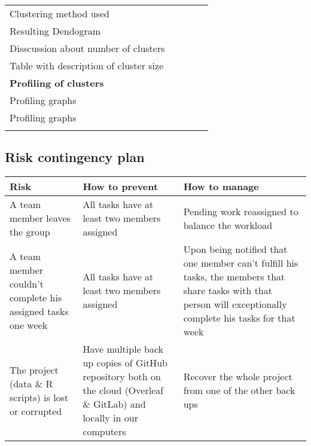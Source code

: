 \begin{table}[H]
\begin{tabular}{@{}lcccc@{}}
Clustering method used                          &    &    &    &    \\
Resulting Dendogram                             &    &    &    &    \\
Disscussion about number of clusters            &    &    &    &    \\
Table with description of cluster size          &    &    &    &    \\ \midrule
\textbf{Profiling of clusters}                  &    &    &    &    \\
Profiling graphs                                &    &    &    &    \\
Profiling graphs                                &    &    &    &    \\
\\ \bottomrule
\end{tabular}
\end{table}

\subsection{Risk contingency plan}%
\label{sub:risk_contingency_plan}


\begin{table}[H]
\centering
\begin{tabular}{@{}p{5cm}p{5cm}p{5cm}@{}}
\toprule
Risk & How to prevent & How to manage \\ \midrule
A team member leaves the group & All tasks have at least two members assigned & Pending work reassigned to balance the workload\\
\addlinespace[0.5em]
A team member couldn't complete his assigned tasks one week & All tasks have at least two members assigned & Upon being notified that one member can't fulfill his tasks, the members that share tasks with that person will exceptionally complete his tasks for that week\\
\addlinespace[0.5em]
The project (data \& R scripts) is lost or corrupted & Have multiple back up copies of GitHub repository both on the cloud (Overleaf \& GitLab) and locally in our computers & Recover the whole project from one of the other back ups\\
\bottomrule
\end{tabular}
\end{table}

